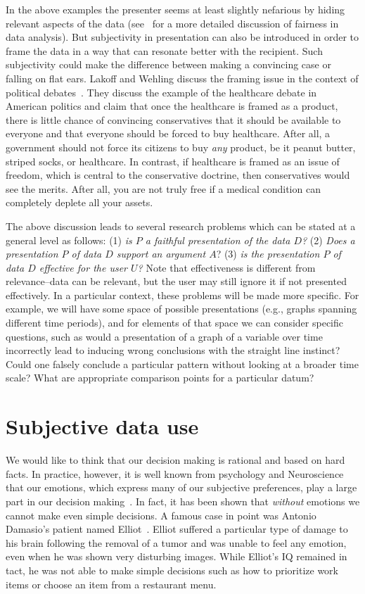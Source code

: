 \documentclass[11pt]{article}
\begin{document}
In the above examples the presenter seems at least slightly nefarious by hiding relevant aspects of the data (see~\cite{DBLP:conf/edbt/StoyanovichAM16} for a more detailed discussion of fairness in data analysis). But subjectivity in presentation can also be introduced in order to frame the data in a way that can resonate better with the recipient. Such subjectivity could make the difference between making a convincing case or falling on flat ears. Lakoff and Wehling discuss the framing issue  in the context of political debates~\cite{lakoff-book}. They discuss the example of the healthcare debate in American politics and claim that once the healthcare is framed as a product, there is little chance of convincing conservatives that it should be available to everyone and that everyone should be forced to buy healthcare. After all, a government should not force its citizens to buy {\em any} product, be it peanut butter, striped socks, or healthcare. In contrast, if healthcare is framed as an issue of freedom, which is central to the conservative doctrine, then conservatives would see the merits. After all, you are not truly free if a medical condition can completely deplete all your assets.   

The above discussion leads to several research problems which can be stated at a general level as follows: 
(1) {\em is $P$ a faithful presentation of the data $D$?} (2) {\em Does a presentation $P$ of data $D$ support an argument $A$}?  (3) {\em is the presentation $P$ of data $D$ effective for the user $U$?} Note that effectiveness is different from relevance--data can be relevant, but the user may still ignore it if not presented effectively. In a particular context, these problems will be made more specific. For example, we will have some space of possible presentations (e.g., graphs spanning different time periods), and for elements of that space we can consider specific questions, such as would a presentation of a graph of a variable over time incorrectly lead to inducing wrong conclusions with the straight line instinct? Could one falsely conclude a particular pattern without looking at a broader time scale?  What are appropriate comparison points for a particular datum? 

\section{Subjective data use}
We would like to think that our decision making is rational and based on hard facts. In practice, however, it is well known from psychology and Neuroscience that our emotions, which express many of our subjective preferences, play a large part in our decision making~\cite{kahneman}. In fact, it has been shown that {\em without} emotions we cannot make even simple decisions. A famous case in point was Antonio Damasio's patient named Elliot~\cite{damasio}. Elliot suffered a particular type of damage to his brain following the removal of a tumor and was unable to feel any emotion, even when he was shown very disturbing images. While Elliot's IQ remained in tact, he was not able to make simple decisions such as how to prioritize work items or choose an item from a restaurant menu.
\end{document}
